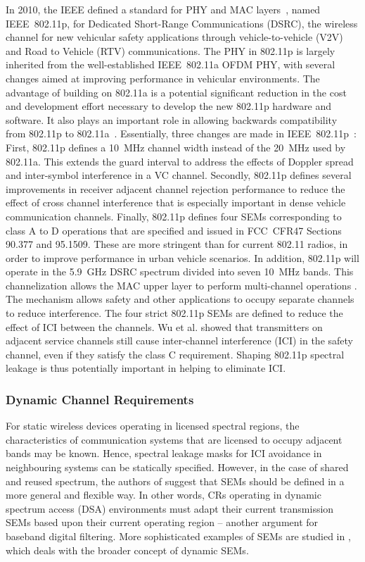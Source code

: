 In 2010, the IEEE defined a standard for PHY and MAC layers~\cite{802-11p2010}, named IEEE~802.11p, for Dedicated Short-Range Communications (DSRC), the wireless channel for new vehicular safety applications through vehicle-to-vehicle (V2V) and Road to Vehicle (RTV) communications.
The PHY in 802.11p is largely inherited from the well-established IEEE~802.11a OFDM PHY, with several changes aimed at improving performance in vehicular environments.
The advantage of building on 802.11a is a potential significant reduction in the cost and development effort necessary to develop the new 802.11p hardware and software.
It also plays an important role in allowing backwards compatibility from 802.11p to 802.11a~\cite{Vandenberghe2011,Fernandez2012}.
Essentially, three changes are made in IEEE~802.11p~\cite{Jiang2008}:
First, 802.11p defines a 10~MHz channel width instead of the 20~MHz used by 802.11a.
This extends the guard interval to address the effects of Doppler spread and inter-symbol interference in a VC channel.
Secondly, 802.11p defines several improvements in receiver adjacent channel rejection performance to reduce the effect of cross channel interference that is especially important in dense vehicle communication channels.
Finally, 802.11p defines four SEMs corresponding to class A to D operations that are specified and issued in FCC~CFR47 Sections 90.377 and 95.1509.
These are more stringent than for current 802.11 radios, in order to improve performance in urban vehicle scenarios.
In addition, 802.11p will operate in the 5.9~GHz DSRC spectrum divided into seven 10~MHz bands.
This channelization allows the MAC upper layer to perform multi-channel operations \cite{WAVE2010}.
The mechanism allows safety and other applications to occupy separate channels to reduce interference.
The four strict 802.11p SEMs are defined to reduce the effect of ICI between the channels. %
Wu et al. \cite{Wu2013} showed that transmitters on adjacent service channels still cause inter-channel interference (ICI) in the safety channel, even if they satisfy the class C requirement.
Shaping 802.11p  spectral leakage is thus potentially important in helping to eliminate ICI.

\subsubsection{Dynamic Channel Requirements}
For static wireless devices operating in licensed spectral regions, the characteristics of communication systems that are licensed to occupy adjacent bands may be known.
Hence, spectral leakage masks for ICI avoidance in neighbouring systems can be statically specified.
However, in the case of shared and reused spectrum, the authors of \cite{Macaluso2014} suggest that SEMs should be defined in a more general and flexible way.
In other words, CRs operating in dynamic spectrum access (DSA) environments must adapt their current transmission SEMs based upon their current operating region -- another argument for baseband digital filtering.
More sophisticated examples of SEMs are studied in \cite{Forde2010}, which deals with the broader concept of dynamic SEMs.

